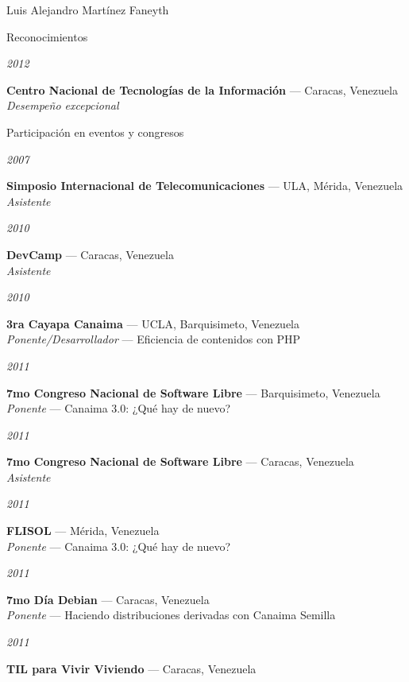 \documentclass[11pt,letterpaper]{article}
\begin{document}
\begin{cv}{Luis Alejandro Mart\'inez Faneyth}
\begin{cvlist}{Reconocimientos}
\item[{\parbox[t]{6em}{\textit{\large{2012}}}}]{
	\parbox[t]{\linewidth}{
		\textbf{Centro Nacional de Tecnolog\'ias de la Informaci\'on} --- Caracas, Venezuela\\
		\textit{Desempe\~no excepcional}
	}
}
\end{cvlist}

\begin{cvlist}{Participaci\'on en eventos y congresos}
\item[{\parbox[t]{6em}{\textit{\large{2007}}}}]{
	\parbox[t]{\linewidth}{
		\textbf{Simposio Internacional de Telecomunicaciones} --- ULA, M\'erida, Venezuela\\
		\textit{Asistente}
	}
}
\item[{\parbox[t]{6em}{\textit{\large{2010}}}}]{
	\parbox[t]{\linewidth}{
		\textbf{DevCamp} --- Caracas, Venezuela\\
		\textit{Asistente}
	}
}
\item[{\parbox[t]{6em}{\textit{\large{2010}}}}]{
	\parbox[t]{\linewidth}{
		\textbf{3ra Cayapa Canaima} --- UCLA, Barquisimeto, Venezuela\\
		\textit{Ponente/Desarrollador} --- Eficiencia de contenidos con PHP
	}
}
\item[{\parbox[t]{6em}{\textit{\large{2011}}}}]{
	\parbox[t]{\linewidth}{
		\textbf{7mo Congreso Nacional de Software Libre} --- Barquisimeto, Venezuela\\
		\textit{Ponente} --- Canaima 3.0: ¿Qu\'e hay de nuevo?
	}
}
\item[{\parbox[t]{6em}{\textit{\large{2011}}}}]{
	\parbox[t]{\linewidth}{
		\textbf{7mo Congreso Nacional de Software Libre} --- Caracas, Venezuela\\
		\textit{Asistente}
	}
}
\item[{\parbox[t]{6em}{\textit{\large{2011}}}}]{
	\parbox[t]{\linewidth}{
		\textbf{FLISOL} --- M\'erida, Venezuela\\
		\textit{Ponente} --- Canaima 3.0: ¿Qu\'e hay de nuevo?
	}
}
\item[{\parbox[t]{6em}{\textit{\large{2011}}}}]{
	\parbox[t]{\linewidth}{
		\textbf{7mo D\'ia Debian} --- Caracas, Venezuela\\
		\textit{Ponente} --- Haciendo distribuciones derivadas con Canaima Semilla
	}
}
\item[{\parbox[t]{6em}{\textit{\large{2011}}}}]{
	\parbox[t]{\linewidth}{
		\textbf{TIL para Vivir Viviendo} --- Caracas, Venezuela\\
}}
\end{cvlist}
\end{cv}
\end{document}
